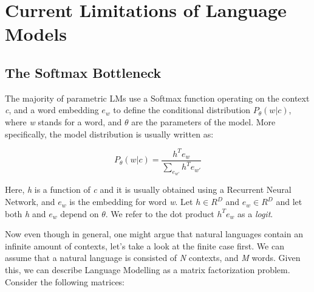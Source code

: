 \chapter{Current Limitations of Language Models}

\section{The Softmax Bottleneck}

The majority of parametric LMs use a Softmax function operating on the context \emph{c}, and a word embedding $ e_w $ to define the conditional distribution $ P_\theta(w|c) $, where \emph{w} stands for a word, and $ \theta $ are the parameters of the model. More specifically, the model distribution is usually written as:

\begin{displaymath}
    P_\theta(w | c) = \frac{h^Te_w}{\sum_{e_{w'}} h^Te_{w'}}
\end{displaymath}

Here, \emph{h} is a function of \emph{c} and it is usually obtained using a Recurrent Neural Network, and $ e_w $ is the embedding for word \emph{w}. Let $ h \in R^D $ and $ e_w \in R^D $ and let both \emph{h} and $ e_w $ depend on $ \theta $. We refer to the dot product $ h^Te_w $ as a \emph{logit}.

Now even though in general, one might argue that natural languages contain an infinite amount of contexts, let's take a look at the finite case first. We can assume that a natural language is consisted of \emph{N} contexts, and \emph{M} words. Given this, we can describe Language Modelling as a matrix factorization problem. Consider the following matrices:

